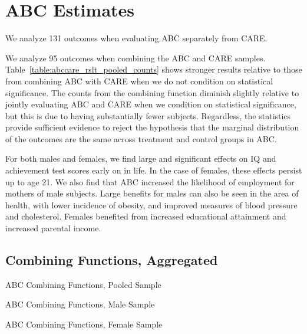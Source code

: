 \section{ABC Estimates}

We analyze 131 outcomes when evaluating ABC separately from CARE. 

We analyze 95 outcomes when combining the ABC and CARE samples. Table~\ref{table:abccare_rslt_pooled_counts} shows stronger results relative to those from combining ABC with CARE when we do not condition on statistical significance. The counts from the combining function diminish slightly relative to jointly evaluating ABC and CARE when we condition on statistical significance, but this is due to having substantially fewer subjects. Regardless, the statistics provide sufficient evidence to reject the hypothesis that the marginal distribution of the outcomes are the same across treatment and control groups in ABC.

For both males and females, we find large and significant effects on IQ and achievement test scores early on in life. In the case of females, these effects persist up to age 21. We also find that ABC increased the likelihood of employment for mothers of male subjects. Large benefits for males can also be seen in the area of health, with lower incidence of obesity, and improved measures of blood pressure and cholesterol. Females benefited from increased educational attainment and increased parental income.

\def\arraystretch{0.6}

\setlength\tabcolsep{0.3em}

\subsection{{Combining Functions, Aggregated}}


	\begin{table}[H]
     \caption{ABC Combining Functions, Pooled Sample} 
     \label{table:abc_rslt_pooled_counts}
	
	\end{table}  

	\begin{table}[H]
     \caption{ABC Combining Functions, Male Sample} 
	
	\end{table}  

	\begin{table}[H]
     \caption{ABC Combining Functions, Female Sample} 
	
	\end{table}  
\clearpage

